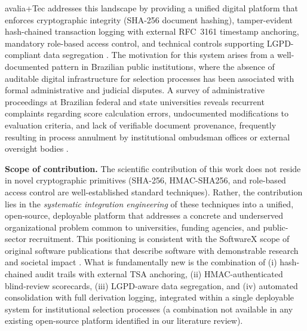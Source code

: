 \documentclass[preprint,12pt,a4paper]{elsarticle}
\begin{document}
\begin{table}[!h]
\caption{Functional comparison of avalia+Tec with existing platforms. Comparison criteria were defined based on regulatory requirements (LGPD/GDPR), security best practices (OWASP, NIST), and institutional governance needs, independently of the proposed system's feature set. Platform capabilities were assessed from official documentation, published source code, and peer-reviewed literature where available.}
\label{tab:comparison}
\end{table}

avalia+Tec addresses this landscape by providing a unified digital platform that enforces cryptographic integrity (SHA-256 document hashing), tamper-evident hash-chained transaction logging with external RFC~3161 timestamp anchoring, mandatory role-based access control, and technical controls supporting LGPD-compliant data segregation \citep{Piotrowski2007,Marques2022}. The motivation for this system arises from a well-documented pattern in Brazilian public institutions, where the absence of auditable digital infrastructure for selection processes has been associated with formal administrative and judicial disputes. A survey of administrative proceedings at Brazilian federal and state universities reveals recurrent complaints regarding score calculation errors, undocumented modifications to evaluation criteria, and lack of verifiable document provenance, frequently resulting in process annulment by institutional ombudsman offices or external oversight bodies \citep{Machado2018,Hood2007}.

\textbf{Scope of contribution.} The scientific contribution of this work does not reside in novel cryptographic primitives (SHA-256, HMAC-SHA256, and role-based access control are well-established standard techniques). Rather, the contribution lies in the \emph{systematic integration engineering} of these techniques into a unified, open-source, deployable platform that addresses a concrete and underserved organizational problem common to universities, funding agencies, and public-sector recruitment. This positioning is consistent with the SoftwareX scope of original software publications that describe software with demonstrable research and societal impact \citep{Sommerville2016}. What is fundamentally new is the combination of (i) hash-chained audit trails with external TSA anchoring, (ii) HMAC-authenticated blind-review scorecards, (iii) LGPD-aware data segregation, and (iv) automated consolidation with full derivation logging, integrated within a single deployable system for institutional selection processes (a combination not available in any existing open-source platform identified in our literature review).
\end{document}
